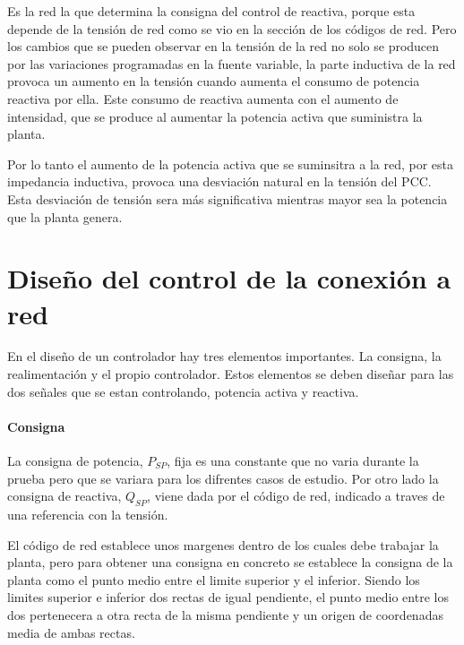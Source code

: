 \documentclass{book}
\begin{document}
Es la red la que determina la consigna del control de reactiva, porque esta depende de la tensi\'on de red como se vio en la secci\'on de los c\'odigos de red. Pero los cambios que se pueden observar en la tensi\'on de la red no solo se producen por las variaciones programadas en la fuente variable, la parte inductiva de la red provoca un aumento en la tensi\'on cuando aumenta el consumo de potencia reactiva por ella. Este consumo de reactiva aumenta con el aumento de intensidad, que se produce al aumentar la potencia activa que suministra la planta.  \par

Por lo tanto el aumento de la potencia activa que se suminsitra a la red, por esta impedancia inductiva, provoca una desviaci\'on natural en la tensi\'on del PCC. Esta desviaci\'on de tensi\'on sera m\'as significativa mientras mayor sea la potencia que la planta genera. \par

	\section{Diseño del control de la conexi\'on a red}

En el diseño de un controlador hay tres elementos importantes. La consigna, la realimentaci\'on y el propio controlador. Estos elementos se deben diseñar para las dos señales que se estan controlando, potencia activa y reactiva. \par

		\paragraph{Consigna}

La consigna de potencia, $P_{SP}$, fija es una constante que no varia durante la prueba pero que se variara para los difrentes casos de estudio. Por otro lado la consigna de reactiva, $Q_{SP}$, viene dada por el c\'odigo de red, indicado a traves de una referencia con la tensi\'on. \par

El c\'odigo de red establece unos margenes dentro de los cuales debe trabajar la planta, pero para obtener una consigna en concreto se establece la consigna de la planta como el punto medio entre el limite superior y el inferior. Siendo los limites superior e inferior dos rectas de igual pendiente, el punto medio entre los dos pertenecera a otra recta de la misma pendiente y un origen de coordenadas media de ambas rectas. \par
\end{document}
